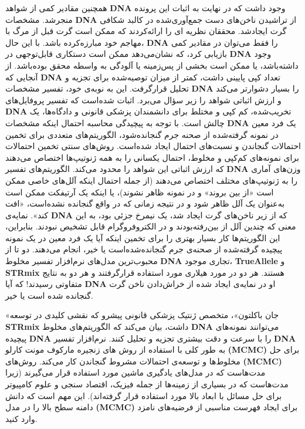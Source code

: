 همچنین مقادیر کمی از شواهد \textenglish{\textbf{DNA}} وجود داشت که در نهایت به اثبات این پرونده منجر‌شد.
مشخصات \textenglish{\textbf{DNA}} از تراشیدن ناخن‌های دست جمع‌آوری‌شده در کالبد شکافی گرت ایجاد‌شد.
محققان نظریه ای را ارائه‌کردند که ممکن است گرت قبل از مرگ با مهاجم خود مبارزه‌کرده باشد.
با این حال، \textenglish{\textbf{DNA}} را فقط می‌توان در مقادیر کمی بازیابی کرد، که نشان‌می‌دهد ممکن است دستکاری قابل‌توجهی در \textenglish{\textbf{DNA}} وجود داشته‌باشد، یا ممکن است بخشی از پس‌زمینه یا آلودگی به واسطه محقق بوده‌باشد.
از آنجایی که \textenglish{\textbf{DNA}} تعداد کپی پایینی داشت، کمتر از میزان توصیه‌شده برای تجزیه و تحلیل قرار‌گرفت.
این به نوبه‌ی خود، تفسیر مشخصات \textenglish{\textbf{DNA}} را بسیار دشوارتر می‌کند و ارزش اثباتی شواهد را زیر سؤال می‌برد.
اثبات شده‌است که تفسیر پروفایل‌های \textenglish{\textbf{DNA}} تخریب‌شده، کم کپی و مختلط برای دانشمندان پزشکی قانونی و دادگاه‌ها، یک چالش است.
با توجه به پیچیدگی محاسبه احتمال اینکه مشخصات \textenglish{\textbf{DNA}} یک فرد معین در نمونه گرفته‌شده از صحنه جرم گنجانده‌شود، الگوریتم‌های متعددی برای تخمین احتمالات گنجاندن و نسبت‌های احتمال ایجاد شده‌است.
روش‌های سنتی تخمین احتمالات برای نمونه‌های کم‌کپی و مخلوط، احتمال یکسانی را به همه ژنوتیپ‌ها اختصاص می‌دهند که ارزش اثباتی این شواهد را محدود می‌کند.
الگوریتم‌های تفسیر \textenglish{\textbf{DNA}} وزن‌های آماری را به ژنوتیپ‌های مختلف اختصاص می‌دهند (از جمله احتمال اینکه آلل‌های خاصی ممکن است «از بین بروند» و در نمونه ظاهر نشوند)، یا اینکه یک آرتیفکت ممکن است به‌عنوان یک آلل ظاهر شود و در نتیجه زمانی که در واقع گنجانده نشده‌است، «افت کند».
نمایه‌ی \textenglish{\textbf{DNA}} که از زیر ناخن‌های گرت ایجاد شد، یک نیمرخ جزئی بود، به این معنی که چندین آلل از بین‌رفته‌بودند و در الکتروفروگرام قابل تشخیص نبودند.
بنابراین، این الگوریتم‌ها کار بسیار بهتری را برای تخمین اینکه آیا یک فرد معین در یک نمونه پیچیده گرفته‌شده از صحنه‌ی جرم گنجانده‌شده‌است یا خیر، انجام می‌دهند.
دو تا از محبوب‌ترین مدل‌های نرم‌افزار تفسیر مخلوط \textenglish{\textbf{DNA}} تجاری موجود، \textenglish{\textbf{TrueAllele}} و \textenglish{\textbf{STRmix}} هستند.
هر دو در مورد هیلاری مورد استفاده قرار‌گرفتند و هر دو به نتایج متفاوتی رسیدند!
که آیا \textenglish{\textbf{DNA}} او در نمایه‌ی ایجاد شده از خراش‌دادن ناخن گرت گنجانده شده است یا خیر.

«جان باکلتون»، متخصص ژنتیک پزشکی قانونی پیشرو که نقشی کلیدی در توسعه \textenglish{\textbf{STRmix}} داشت، بیان می‌کند که الگوریتم‌های مخلوط \textenglish{\textbf{DNA}} می‌توانند نمونه‌های پیچیده \textenglish{\textbf{DNA}} را با سرعت و دقت بیشتری تجزیه و تحلیل کنند.
نرم‌افزار تفسیر \textenglish{\textbf{DNA}} به طور کلی با استفاده از روش های زنجیره مارکوف مونت کارلو \textenglish{\textbf{(MCMC)}} برای حل مخلوط‌ها و توسعه‌ی احتمالات مشروط گنجاندن کار می‌کند.
روش‌های \textenglish{\textbf{(MCMC)}} مدت‌هاست که در مدل‌های یادگیری ماشین مورد استفاده قرار می‌گیرند (زیرا مدت‌هاست که در بسیاری از زمینه‌ها از جمله فیزیک، اقتصاد سنجی و علوم کامپیوتر برای حل مسائل با ابعاد بالا مورد استفاده قرار گرفته‌اند).
این مهم است که دانش دامنه سطح بالا را در مدل \textenglish{\textbf{(MCMC)}} برای ایجاد فهرست مناسبی از فرضیه‌های نامزد وارد کنید.

